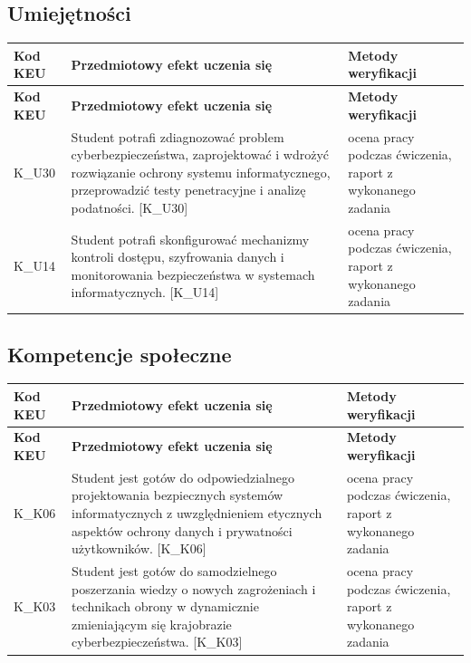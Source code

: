 \documentclass[12pt, a4paper]{article}
\newcommand{\thdrule}{\noalign{\global\setlength{\extrarowheight}{0pt}}}
\newcommand{\thdend}{\noalign{\global\setlength{\extrarowheight}{3pt}}}
\begin{document}
\subsection*{Umiejętności}
{\scriptsize
\begin{longtable}{m{1.6cm}m{9.0cm}m{4.2cm}}
\thdrule\toprule
\rowcolor{pjatkRed} {\color{white}\footnotesize\textbf{\vphantom{Ag}Kod KEU}} & {\color{white}\footnotesize\textbf{\vphantom{Ag}Przedmiotowy efekt uczenia się}} & {\color{white}\footnotesize\textbf{\vphantom{Ag}Metody weryfikacji}} \\
\midrule\thdend
\endfirsthead
\thdrule\toprule
\rowcolor{pjatkRed} {\color{white}\footnotesize\textbf{\vphantom{Ag}Kod KEU}} & {\color{white}\footnotesize\textbf{\vphantom{Ag}Przedmiotowy efekt uczenia się}} & {\color{white}\footnotesize\textbf{\vphantom{Ag}Metody weryfikacji}} \\
\midrule\thdend
\endhead
  \rowcolor{tableRowLight} K\_U30 & Student potrafi zdiagnozować problem cyberbezpieczeństwa, zaprojektować i wdrożyć rozwiązanie ochrony systemu informatycznego, przeprowadzić testy penetracyjne i analizę podatności. {[}K\_U30{]} & ocena pracy podczas ćwiczenia, raport z wykonanego zadania \\
  \rowcolor{tableRowAlt} K\_U14 & Student potrafi skonfigurować mechanizmy kontroli dostępu, szyfrowania danych i monitorowania bezpieczeństwa w systemach informatycznych. {[}K\_U14{]} & ocena pracy podczas ćwiczenia, raport z wykonanego zadania \\
\bottomrule
\end{longtable}}

\subsection*{Kompetencje społeczne}
{\scriptsize
\begin{longtable}{m{1.6cm}m{9.0cm}m{4.2cm}}
\thdrule\toprule
\rowcolor{pjatkRed} {\color{white}\footnotesize\textbf{\vphantom{Ag}Kod KEU}} & {\color{white}\footnotesize\textbf{\vphantom{Ag}Przedmiotowy efekt uczenia się}} & {\color{white}\footnotesize\textbf{\vphantom{Ag}Metody weryfikacji}} \\
\midrule\thdend
\endfirsthead
\thdrule\toprule
\rowcolor{pjatkRed} {\color{white}\footnotesize\textbf{\vphantom{Ag}Kod KEU}} & {\color{white}\footnotesize\textbf{\vphantom{Ag}Przedmiotowy efekt uczenia się}} & {\color{white}\footnotesize\textbf{\vphantom{Ag}Metody weryfikacji}} \\
\midrule\thdend
\endhead
  \rowcolor{tableRowLight} K\_K06 & Student jest gotów do odpowiedzialnego projektowania bezpiecznych systemów informatycznych z uwzględnieniem etycznych aspektów ochrony danych i prywatności użytkowników. {[}K\_K06{]} & ocena pracy podczas ćwiczenia, raport z wykonanego zadania \\
  \rowcolor{tableRowAlt} K\_K03 & Student jest gotów do samodzielnego poszerzania wiedzy o nowych zagrożeniach i technikach obrony w dynamicznie zmieniającym się krajobrazie cyberbezpieczeństwa. {[}K\_K03{]} & ocena pracy podczas ćwiczenia, raport z wykonanego zadania \\
\bottomrule
\end{longtable}}
\end{document}

